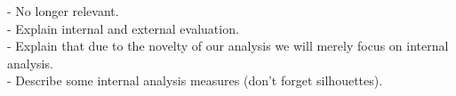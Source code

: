 \begin{Notes}
- No longer relevant.\\
- Explain internal and external evaluation.\\
- Explain that due to the novelty of our analysis we will merely focus on
internal analysis.\\
- Describe some internal analysis measures (don't forget silhouettes).\\
\end{Notes}







